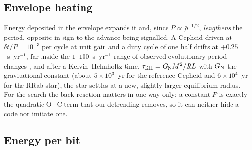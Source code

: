 \documentclass[final,5p]{elsarticle}
\newcommand{\oc}{O$-$C}
\newcommand{\dtp}{\ensuremath{\delta t/P}}
\begin{document}
\subsection{Envelope heating}
\label{sec:heating}

Energy deposited in the envelope expands it and, since $P\propto\bar\rho^{-1/2}$, \emph{lengthens} the period, opposite in sign to the advance being signalled. A Cepheid driven at $\dtp=10^{-3}$ per cycle at unit gain and a duty cycle of one half drifts at $+0.25$~s~yr$^{-1}$, far inside the $1$--$100$~s~yr$^{-1}$ range of observed evolutionary period changes \citep{Turner2006, Neilson2015, Csornyei2022}, and after a Kelvin--Helmholtz time, $\tau_{\rm KH}=G_{\rm N}M^2/RL$ with $G_{\rm N}$ the gravitational constant (about $5\times10^{3}$~yr for the reference Cepheid and $6\times10^{4}$~yr for the RRab star), the star settles at a new, slightly larger equilibrium radius. For the search the back-reaction matters in one way only: a constant $\dot P$ is exactly the quadratic \oc{} term that our detrending removes, so it can neither hide a code nor imitate one.

\subsection{Energy per bit}
\label{sec:cost}
\end{document}
